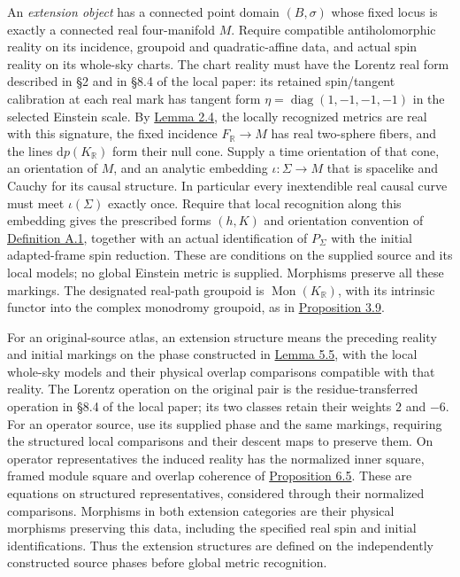 \documentclass[
  english,
  11pt,
  reqno]{amsart}
\begin{document}
An \emph{extension object} has a connected point domain \((B,\sigma)\)
whose fixed locus is exactly a connected real four-manifold \(M\).
Require compatible antiholomorphic reality on its incidence, groupoid
and quadratic-affine data, and actual spin reality on its whole-sky
charts. The chart reality must have the Lorentz real form described in
§2 and in §8.4 of the local paper: its retained spin/tangent calibration
at each real mark has tangent form
\(\eta=\operatorname{diag}(1,-1,-1,-1)\) in the selected Einstein scale.
By \hyperref[lem:independent-ray-lorentz-recognition-v092]{Lemma 2.4},
the locally recognized metrics are real with this signature, the fixed
incidence \(F_{\mathbb R}\to M\) has real two-sphere fibers, and the
lines \(\mathrm dp(K_{\mathbb R})\) form their null cone. Supply a time
orientation of that cone, an orientation of \(M\), and an analytic
embedding \(\iota:\Sigma\to M\) that is spacelike and Cauchy for its
causal structure. In particular every inextendible real causal curve
must meet \(\iota(\Sigma)\) exactly once. Require that local recognition
along this embedding gives the prescribed forms \((h,K)\) and
orientation convention of \hyperref[def:analytic-ghd-v2]{Definition
A.1}, together with an actual identification of \(P_\Sigma\) with the
initial adapted-frame spin reduction. These are conditions on the
supplied source and its local models; no global Einstein metric is
supplied. Morphisms preserve all these markings. The designated
real-path groupoid is \(\operatorname{Mon}(K_{\mathbb R})\), with its
intrinsic functor into the complex monodromy groupoid, as in
\hyperref[prop:real-path-groupoid-v08]{Proposition 3.9}.

For an original-source atlas, an extension structure means the preceding
reality and initial markings on the phase constructed in
\hyperref[lem:source-atlas-phase-completion]{Lemma 5.5}, with the local
whole-sky models and their physical overlap comparisons compatible with
that reality. The Lorentz operation on the original pair is the
residue-transferred operation in §8.4 of the local paper; its two
classes retain their weights \(2\) and \(-6\). For an operator source,
use its supplied phase and the same markings, requiring the structured
local comparisons and their descent maps to preserve them. On operator
representatives the induced reality has the normalized inner square,
framed module square and overlap coherence of
\hyperref[prop:operator-monodromy-lorentz-reality]{Proposition 6.5}.
These are equations on structured representatives, considered through
their normalized comparisons. Morphisms in both extension categories are
their physical morphisms preserving this data, including the specified
real spin and initial identifications. Thus the extension structures are
defined on the independently constructed source phases before global
metric recognition.
\end{document}
